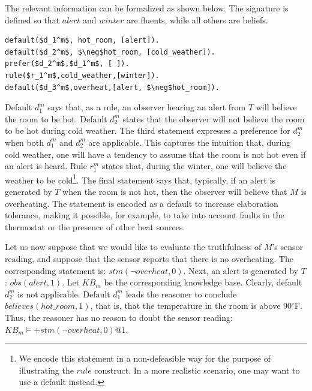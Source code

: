 \documentclass{article}
\begin{document}
The relevant information can be formalized as shown below. The signature is defined so that $alert$ and $winter$ are fluents, while all others are beliefs. %

%
\begin{lstlisting}[language=clingo,numbers=none,caption=Relevant Information, label=lst:pi_M, mathescape=true,xleftmargin=.01\textwidth, breaklines=true]
default($d_1^m$, hot_room, [alert]). 
default($d_2^m$, $\neg$hot_room, [cold_weather]). 
prefer($d_2^m$,$d_1^m$, [ ]). 
rule($r_1^m$,cold_weather,[winter]). 
default($d_3^m$,overheat,[alert, $\neg$hot_room]).
\end{lstlisting}



Default $d_1^m$ says that, as a rule, an observer hearing an alert from $T$ will believe the room to be hot. Default $d_2^m$ states that the observer will not believe the room to be hot during cold weather. The third statement expresses a preference for $d_2^m$ when both $d_1^m$ and $d_2^m$ are applicable. This captures the intuition that, during cold weather,  one will have a tendency to assume that the room is not hot even if an alert is heard. Rule $r_1^m$ states that, during the winter, one will believe the weather to be cold\footnote{We encode this statement in a non-defeasible way for the purpose of illustrating the $rule$ construct. In a more realistic scenario, one may want to use a default instead.}. The final statement says that, typically, if an alert is generated by $T$ when the room is not hot, then the observer will believe that $M$ is overheating. The statement is encoded as a default to increase elaboration tolerance, making it possible, for example, to take into account faults in the thermostat or the presence of other heat sources.

Let us now suppose that we would like to evaluate the truthfulness of $M$'s sensor reading, and suppose that the sensor reports that there is no overheating. The corresponding statement is:
$stm(\neg overheat,0).$
Next, an alert is generated by $T$:
$
obs(alert,1).
$
Let $KB_m$ be the corresponding knowledge base. Clearly, default $d_2^m$ is not applicable. Default $d_1^m$ leads the reasoner to conclude $believes(hot\_room,1)$, that is, that the temperature in the room is above $90^\circ$F. Thus, the reasoner has no reason to doubt the sensor reading:
$
KB_{m} \models {+}stm(\neg overheat,0)@1.
$
\end{document}
